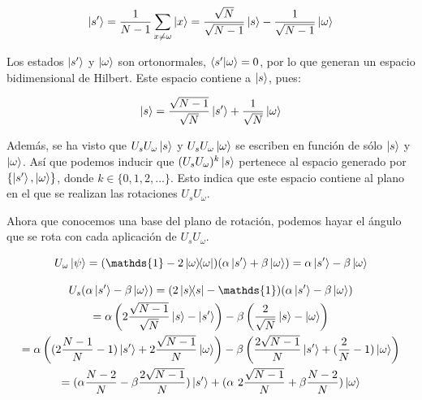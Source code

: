 \begin{equation}
    \ket{s^\prime} = \frac{1}{N-1} \sum\limits_{x \neq \omega} \ket{x}
               = \frac{\sqrt{N}}{\sqrt{N-1}}\ket{s} - \frac{1}{\sqrt{N-1}} \ket{\omega}
\end{equation}

Los estados $\ket{s^\prime}$ y $\ket{\omega}$ son ortonormales, $\braket{s^\prime}{\omega} = 0$, por lo que generan un espacio bidimensional de Hilbert. Este espacio contiene a $\ket{s}$, pues:

\begin{equation}
    \ket{s} = \frac{\sqrt{N-1}}{\sqrt{N}}\ket{s^\prime} + \frac{1}{\sqrt{N}}\ket{\omega}
\end{equation}

Además, se ha visto que $U_s U_\omega \ket{s}$ y $U_s U_\omega \ket{\omega}$ se escriben en función de sólo $\ket{s}$ y $\ket{\omega}$. Así que podemos inducir que $(U_s U_\omega)^k \ket{s}$ pertenece al espacio generado por $\{\ket{s^\prime}, \ket{\omega}\}$, donde $k \in \{0, 1, 2, ...\}$. Esto indica que este espacio contiene al plano en el que se realizan las rotaciones $U_s U_\omega$.

Ahora que conocemos una base del plano de rotación, podemos hayar el ángulo que se rota con cada aplicación de $U_s U_\omega$.

\begin{equation}
    U_\omega \ket{\psi}
    = (\mathds{1} - 2 \ketbra{\omega}{\omega}) (\alpha \ket{s^\prime} + \beta \ket{\omega})
    = \alpha \ket{s^\prime} - \beta \ket{\omega}
\end{equation}

\begin{multline}
    U_s (\alpha \ket{s^\prime} - \beta \ket{\omega})
    = (2 \ketbra{s}{s} - \mathds{1}) (\alpha \ket{s^\prime} - \beta \ket{\omega}) \\
    = \alpha \left(2 \frac{\sqrt{N-1}}{\sqrt{N}} \ket{s} - \ket{s^\prime}\right) - \beta \left(\frac{2}{\sqrt{N}} \ket{s} - \ket{\omega}\right) \\
    = \alpha \left((2\frac{N-1}{N} - 1) \ket{s^\prime} + 2\frac{\sqrt{N-1}}{N}\ket{\omega}\right)
    - \beta \left(\frac{2\sqrt{N-1}}{N}\ket{s^\prime} + (\frac{2}{N}-1)\ket{\omega}\right) \\
    = (\alpha \frac{N-2}{N} - \beta \frac{2\sqrt{N-1}}{N}) \ket{s^\prime}
    + (\alpha\ 2\frac{\sqrt{N-1}}{N} + \beta  \frac{N-2}{N}) \ket{\omega} \\
\end{multline}

